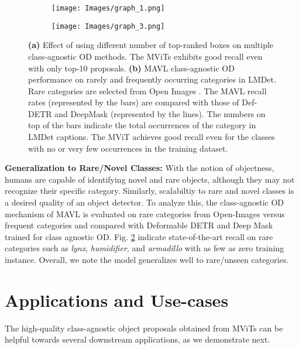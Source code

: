 \documentclass[runningheads]{llncs}
\begin{document}
\begin{figure}[!t]
  \centering
  \begin{subfigure}{.51\textwidth}
    \centering
    \texttt{[image: Images/graph\_1.png]}
    \caption{\small}
    \label{graph_1}
  \end{subfigure}\hfill
  \begin{subfigure}{.48\textwidth}
    \centering
    \texttt{[image: Images/graph\_3.png]}
    \caption{}
    \label{fig:unseen_classes}
    
  \end{subfigure}\caption{\small \textbf{\color{blue}(a)} Effect of using different number of top-ranked boxes on multiple class-agnostic OD methods. The MViTs exhibits good recall even with only top-10 proposals. \textbf{\color{blue}(b)} MAVL class-agnostic OD performance on rarely and frequently occurring categories in LMDet. Rare categories are selected from Open Images \cite{OpenImages}. The MAVL recall rates (represented by the bars) are compared with those of Def-DETR \cite{zhu2020deformable} and DeepMask \cite{pinheiro2015learning} (represented by the lines). The numbers on top of the bars indicate the total occurrences of the category in LMDet captions. The MViT achieves good recall even for the classes with no or very few occurrences in the training dataset.}
\label{fig:1-3}
\end{figure}

\noindent \textbf{Generalization to Rare/Novel Classes:}
With the notion of objectness, humans are capable of identifying novel and rare objects, although they may not recognize their specific category. Similarly, scalabiltiy to rare and novel classes is a desired quality of an object detector. To analyze this, the class-agnostic OD mechanism of MAVL is evaluated on rare categories from Open-Images \cite{OpenImages} versus frequent categories and compared with Deformable DETR and Deep Mask trained for class agnostic OD. Fig. \ref{fig:unseen_classes} indicate state-of-the-art recall on rare categories such as \emph{lynx}, \emph{humidifier}, and \emph{armadillo} with as few as zero training instance. Overall, we note the model generalizes well to rare/unseen categories.

\section{Applications and Use-cases}\label{sec:app}
The high-quality class-agnostic object proposals obtained from MViTs can be helpful towards several downstream applications, as we demonstrate next. 
\end{document}
